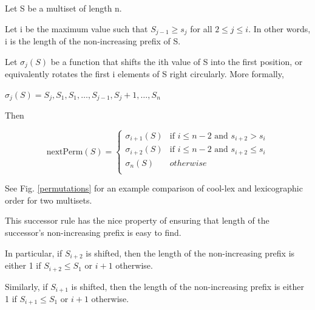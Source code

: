 \noindent Let S be a multiset of length n.

\noindent Let i be the maximum value such that $S_{j-1} \ge s_j$ for all $2 \le j \le i$.  In other words, i is the length of the non-increasing prefix of S.  

\noindent Let $\sigma_j(S)$ be a function that shifts the ith value of S into the first position, or equivalently rotates the first i elements of S right circularly.  More formally, 

\noindent $\sigma_j(S)=S_j,S_1,S_1,\dots,S_{j-1},S_j+1,\dots,S_n $

Then

\begin{equation*}
    \text{nextPerm}(S) = \begin{cases}
	\sigma_{i+1}(S) & \text{if $i \le n-2$ and $s_{i+2} > s_i$}\\
	\sigma_{i+2}(S) & \text{if $i \le n-2$ and $s_{i+2} \le s_i$}\\
	\sigma_{n}(S) & otherwise\\
\end{cases}
\end{equation*}


See Fig. \ref{permutations} for an example comparison of cool-lex and lexicographic order for two multisets.

This successor rule has the nice property of ensuring that length of the successor's non-increasing prefix is easy to find.

In particular, if $S_{i+2}$ is shifted, then the length of the non-increasing prefix is either 1 if $S_{i+2}\le S_1$ or $i+1$ otherwise. 

Similarly, if $S_{i+1}$ is shifted, then the length of the non-increasing prefix is either 1 if $S_{i+1}\le S_1$ or $i+1$ otherwise. 

